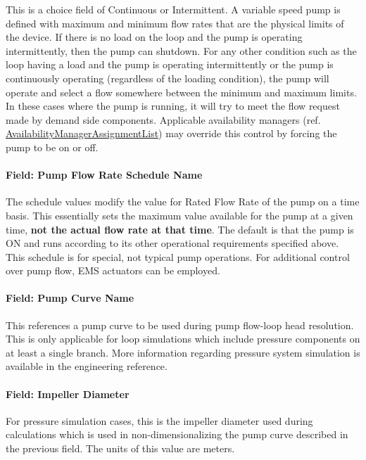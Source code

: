 This is a choice field of Continuous or Intermittent. A variable speed pump is defined with maximum and minimum flow rates that are the physical limits of the device. If there is no load on the loop and the pump is operating intermittently, then the pump can shutdown. For any other condition such as the loop having a load and the pump is operating intermittently or the pump is continuously operating (regardless of the loading condition), the pump will operate and select a flow somewhere between the minimum and maximum limits. In these cases where the pump is running, it will try to meet the flow request made by demand side components. Applicable availability managers (ref. \hyperref[availabilitymanagerassignmentlist]{AvailabilityManagerAssignmentList}) may override this control by forcing the pump to be on or off.

\paragraph{Field: Pump Flow Rate Schedule Name}\label{field-pump-flow-rate-schedule-name-000}

The schedule values modify the value for Rated Flow Rate of the pump on a time basis. This essentially sets the maximum value available for the pump at a given time, \textbf{not the actual flow rate at that time}. The default is that the pump is ON and runs according to its other operational requirements specified above. This schedule is for special, not typical pump operations. For additional control over pump flow, EMS actuators can be employed.

\paragraph{Field: Pump Curve Name}\label{field-pump-curve-name}

This references a pump curve to be used during pump flow-loop head resolution. This is only applicable for loop simulations which include pressure components on at least a single branch. More information regarding pressure system simulation is available in the engineering reference.

\paragraph{Field: Impeller Diameter}\label{field-impeller-diameter}

For pressure simulation cases, this is the impeller diameter used during calculations which is used in non-dimensionalizing the pump curve described in the previous field. The units of this value are meters.

